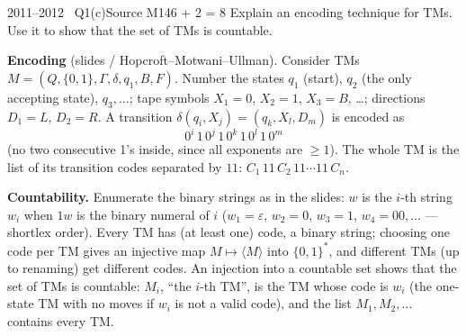 \documentclass[11pt,a4paper]{article}
\newcommand{\eps}{\varepsilon}
\begin{document}
\begin{question}{2011--2012 \textbullet\ Q1(c)}{Source M14}{6 + 2 = 8}
Explain an encoding technique for TMs. Use it to show that the set of TMs is countable.
\end{question}
\begin{solution}
\textbf{Encoding} (slides / Hopcroft--Motwani--Ullman). Consider TMs $M=(Q,\{0,1\},\Gamma,\delta,q_1,B,F)$. Number the states $q_1$ (start), $q_2$ (the only accepting state), $q_3,\dots$; tape symbols $X_1=0$, $X_2=1$, $X_3=B$, \dots; directions $D_1=L$, $D_2=R$. A transition $\delta(q_i,X_j)=(q_k,X_l,D_m)$ is encoded as
\[ 0^i\,1\,0^j\,1\,0^k\,1\,0^l\,1\,0^m \]
(no two consecutive 1's inside, since all exponents are $\ge1$). The whole TM is the list of its transition codes separated by $11$: $C_1\,11\,C_2\,11\cdots11\,C_n$.

\textbf{Countability.} Enumerate the binary strings as in the slides: $w$ is the $i$-th string $w_i$ when $1w$ is the binary numeral of $i$ ($w_1=\eps$, $w_2=0$, $w_3=1$, $w_4=00,\dots$ --- shortlex order). Every TM has (at least one) code, a binary string; choosing one code per TM gives an injective map $M\mapsto\langle M\rangle$ into $\{0,1\}^*$, and different TMs (up to renaming) get different codes. An injection into a countable set shows that the set of TMs is countable: $M_i$, ``the $i$-th TM'', is the TM whose code is $w_i$ (the one-state TM with no moves if $w_i$ is not a valid code), and the list $M_1,M_2,\dots$ contains every TM.
\end{solution}
\end{document}
